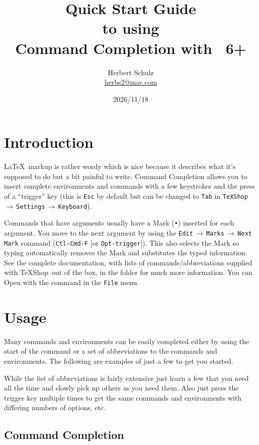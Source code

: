 \documentclass[11pt]{article}
\title{Quick Start Guide\\ to using\\ Command Completion with \TS\ 6+}
\author{Herbert Schulz\\\small\href{mailto:herbs2@mac.com}{herbs2@mac.com}}
\date{2026/11/18}
\newcommand{\mnu}[1]{\texttt{#1}}
\newcommand{\cmd}[1]{\texttt{#1}}
\newcommand{\To}{\,\(\to\)\,}
\newcommand{\TS}{\textsf{\TeX Shop}}
\begin{document}
\maketitle
\thispagestyle{empty}

\section*{Introduction}

\LaTeX\ markup is rather wordy which is nice because it describes what it's supposed to do but a bit painful to write. Command Completion allows you to insert complete environments and commands with a few keystrokes and the press of a ``trigger'' key (this is \cmd{Esc} by default but can be changed to \cmd{Tab} in \mnu{TeXShop}\To\mnu{Settings}\To\mnu{Keyboard}).

Commands that have arguments usually have a Mark (\texttt{•}) inserted for each argument. You move to the next argument by using the \mnu{Edit}\To\mnu{Marks}\To\mnu{Next Mark} command (\cmd{Ctl-Cmd-F} [or \cmd{Opt-trigger}]). This also selects the Mark so typing automatically removes the Mark and substitutes the typed information. See the complete documentation, with lists of commands/abbreviations supplied with \TS\ out of the box, in the  folder for much more information. You can Open  with the command in the \mnu{File} menu.

\section*{Usage}

Many commands and environments can be easily completed either by using the start of the command or a set of abbreviations to the commands and environments. The following are examples of just a few to get you started.

While the list of abbreviations is fairly extensive just learn a few that you need all the time and slowly pick up others as you need them. Also just press the trigger key multiple times to get the same commands and environments with differing numbers of options, etc.

\subsection*{Command Completion}
\end{document}
